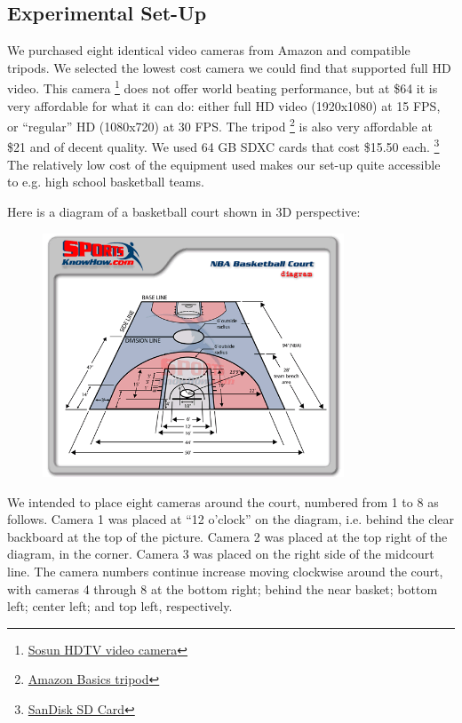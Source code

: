 \documentclass{article}
\begin{document}
\subsection{Experimental Set-Up}
We purchased eight identical video cameras from Amazon and compatible tripods.
We selected the lowest cost camera we could find that supported full HD video.
This camera
\footnote{
\href{https://www.amazon.com/Camcorder-SOSUN-Rotatable-Batteries-301S-Plus/dp/B07CZ3WXYX/ref=sr_1_1?ie=UTF8&qid=1545104673&sr=8-1&keywords=sosun}
{Sosun HDTV video camera}}
does not offer world beating performance, but at \$64 it is very affordable for what it can do: 
either full HD video (1920x1080) at 15 FPS, or ``regular'' HD (1080x720) at 30 FPS.
The tripod 
\footnote{\href{https://www.amazon.com/gp/product/B005KP473Q/ref=oh_aui_detailpage_o04_s01?ie=UTF8&psc=1}
{Amazon Basics tripod}}
is also very affordable at \$21 and of decent quality.
We used 64 GB SDXC cards that cost \$15.50 each.
\footnote{
\href{https://www.amazon.com/gp/product/B00CXI1EI4/ref=oh_aui_detailpage_o06_s00?ie=UTF8&psc=1}
{SanDisk SD Card}}
The relatively low cost of the equipment used makes our set-up quite accessible to e.g. high school basketball teams.

Here is a diagram of a basketball court shown in 3D perspective:
\begin{figure}[H]
\centering
\includegraphics[width=0.80\textwidth]{NBA-court-diagram.png}
\end{figure}

We intended to place eight cameras around the court, numbered from 1 to 8 as follows.  
Camera 1 was placed at ``12 o'clock'' on the diagram, i.e. behind the clear backboard at the top of the picture.
Camera 2 was placed at the top right of the diagram, in the corner.
Camera 3 was placed on the right side of the midcourt line.
The camera numbers continue increase moving clockwise around the court, with cameras 4 through 8 at
the bottom right; behind the near basket; bottom left; center left; and top left, respectively.
\end{document}
